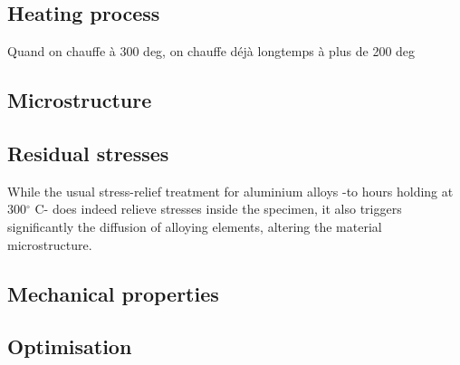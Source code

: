 \subsection{Heating process}
Quand on chauffe à 300 deg, on chauffe déjà longtemps à plus de 200 deg

\subsection{Microstructure}

\subsection{Residual stresses}

While the usual stress-relief treatment for aluminium alloys -to hours holding at 300$^\circ$ C- does indeed relieve stresses inside the specimen, it also triggers significantly the diffusion of alloying elements, altering the material microstructure.

\subsection{Mechanical properties}


\subsection{Optimisation}



